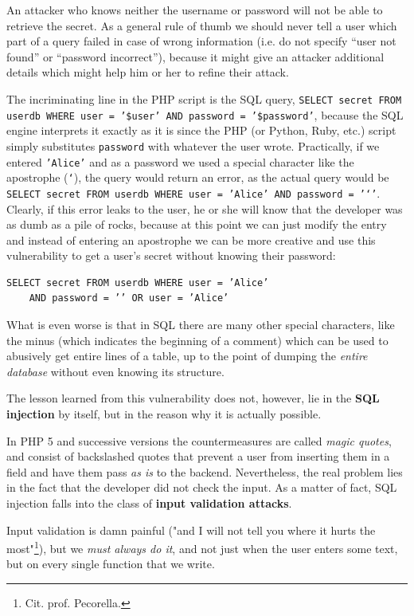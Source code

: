 An attacker who knows neither the username or password will not be able to retrieve the secret. As a general rule of thumb we should never tell a user which part of a query failed in case of wrong information (i.e. do not specify “user not found” or “password incorrect”), because it might give an attacker additional details which might help him or her to refine their attack.

The incriminating line in the PHP script is the SQL query, \texttt{SELECT secret FROM userdb WHERE user = ’\$user’ AND password = ’\$password’}, because the SQL engine interprets it exactly as it is since the PHP (or Python, Ruby, etc.) script simply substitutes \texttt{password} with whatever the user wrote. Practically, if we entered \texttt{'Alice'} and as a password we used a special character like the apostrophe (\texttt{‘}), the query would return an error, as the actual query would be \texttt{SELECT secret FROM userdb WHERE user = ’Alice’ AND password = ’‘’}. Clearly, if this error leaks to the user, he or she will know that the developer was as dumb as a pile of rocks, because at this point we can just modify the entry and instead of entering an apostrophe we can be more creative and use this vulnerability to get a user’s secret without knowing their password:

\begin{verbatim}
SELECT secret FROM userdb WHERE user = ’Alice’
    AND password = ’’ OR user = ’Alice’
\end{verbatim}
 
What is even worse is that in SQL there are many other special characters, like the minus (which indicates the beginning of a comment) which can be used to abusively get entire lines of a table, up to the point of dumping the \textit{entire database} without even knowing its structure. 

The lesson learned from this vulnerability does not, however, lie in the \textbf{SQL injection} by itself, but in the reason why it is actually possible.

In PHP 5 and successive versions the countermeasures are called \textit{magic quotes}, and consist of backslashed quotes that prevent a user from inserting them in a field and have them pass \textit{as is} to the backend. Nevertheless, the real problem lies in the fact that the developer did not check the input. As a matter of fact, SQL injection falls into the class of \textbf{input validation attacks}.

Input validation is damn painful ("and I will not tell you where it hurts the most"\footnote{Cit. prof. Pecorella.}), but we \textit{must always do it}, and not just when the user enters some text, but on every single function that we write.

